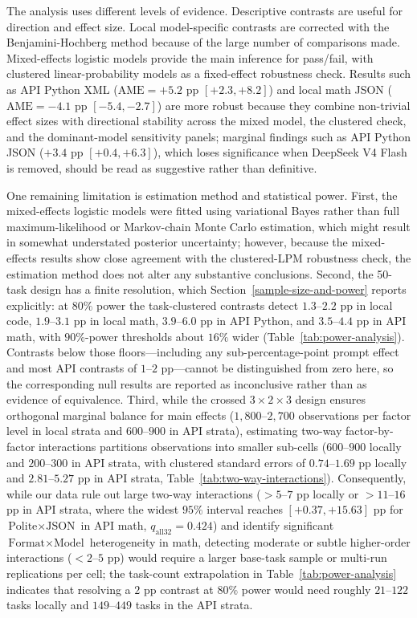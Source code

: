 \documentclass[a4paper,fleqn]{cas-sc}
\begin{document}
The analysis uses different levels of evidence. Descriptive contrasts are useful for direction and effect size. Local model-specific contrasts are corrected with the Benjamini-Hochberg method because of the large number of comparisons made. Mixed-effects logistic models provide the main inference for pass/fail, with clustered linear-probability models as a fixed-effect robustness check. Results such as API Python XML ($\text{AME} = +5.2$ pp $[+2.3, +8.2]$) and local math JSON ($\text{AME} = -4.1$ pp $[-5.4, -2.7]$) are more robust because they combine non-trivial effect sizes with directional stability across the mixed model, the clustered check, and the dominant-model sensitivity panels; marginal findings such as API Python JSON ($+3.4$ pp $[+0.4, +6.3]$), which loses significance when DeepSeek V4 Flash is removed, should be read as suggestive rather than definitive.

One remaining limitation is estimation method and statistical power. First, the mixed-effects logistic models were fitted using variational Bayes rather than full maximum-likelihood or Markov-chain Monte Carlo estimation, which might result in somewhat understated posterior uncertainty; however, because the mixed-effects results show close agreement with the clustered-LPM robustness check, the estimation method does not alter any substantive conclusions. Second, the 50-task design has a finite resolution, which Section~\ref{sample-size-and-power} reports explicitly: at $80\%$ power the task-clustered contrasts detect $1.3$--$2.2$ pp in local code, $1.9$--$3.1$ pp in local math, $3.9$--$6.0$ pp in API Python, and $3.5$--$4.4$ pp in API math, with $90\%$-power thresholds about $16\%$ wider (Table~\ref{tab:power-analysis}). Contrasts below those floors---including any sub-percentage-point prompt effect and most API contrasts of $1$--$2$ pp---cannot be distinguished from zero here, so the corresponding null results are reported as inconclusive rather than as evidence of equivalence. Third, while the crossed $3 \times 2 \times 3$ design ensures orthogonal marginal balance for main effects ($1,800$--$2,700$ observations per factor level in local strata and $600$--$900$ in API strata), estimating two-way factor-by-factor interactions partitions observations into smaller sub-cells ($600$--$900$ locally and $200$--$300$ in API strata, with clustered standard errors of $0.74$--$1.69$ pp locally and $2.81$--$5.27$ pp in API strata, Table~\ref{tab:two-way-interactions}). Consequently, while our data rule out large two-way interactions ($>5$--$7$ pp locally or $>11$--$16$ pp in API strata, where the widest $95\%$ interval reaches $[+0.37, +15.63]$ pp for $\text{Polite} \times \text{JSON}$ in API math, $q_{\text{all32}} = 0.424$) and identify significant $\text{Format} \times \text{Model}$ heterogeneity in math, detecting moderate or subtle higher-order interactions ($<2$--$5$ pp) would require a larger base-task sample or multi-run replications per cell; the task-count extrapolation in Table~\ref{tab:power-analysis} indicates that resolving a $2$ pp contrast at $80\%$ power would need roughly $21$--$122$ tasks locally and $149$--$449$ tasks in the API strata.
\end{document}
